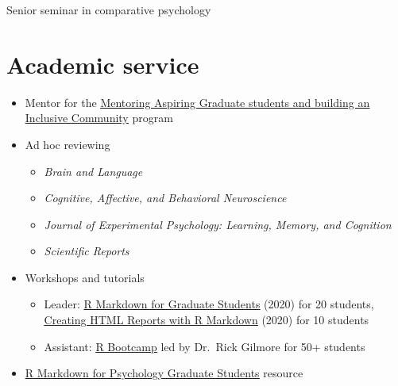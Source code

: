\documentclass[11pt,a4paper,]{awesome-cv}
\providecommand{\tightlist}{%
	\setlength{\itemsep}{0pt}\setlength{\parskip}{0pt}}
\begin{document}
\begin{cventries}
{\begin{cvitems}
\item Senior seminar in comparative psychology
\end{cvitems}}
\end{cventries}

\hypertarget{academic-service}{%
\section{Academic service}\label{academic-service}}

\begin{itemize}
\tightlist
\item
  Mentor for the
  \href{https://magic.initiative.uconn.edu/}{\underline{Mentoring Aspiring Graduate students and building an Inclusive Community}}
  program
\item
  Ad hoc reviewing

  \begin{itemize}
  \tightlist
  \item
    \emph{Brain and Language}
  \item
    \emph{Cognitive, Affective, and Behavioral Neuroscience}
  \item
    \emph{Journal of Experimental Psychology: Learning, Memory, and
    Cognition}
  \item
    \emph{Scientific Reports}
  \end{itemize}
\item
  Workshops and tutorials

  \begin{itemize}
  \tightlist
  \item
    Leader:
    \href{https://github.com/hollzzar/markdown-tutorial}{\underline{R Markdown for Graduate Students}}
    (2020) for 20 students,
    \href{https://github.com/hollzzar/reports-with-markdown}{\underline{Creating HTML Reports with R Markdown}}
    (2020) for 10 students
  \item
    Assistant:
    \href{https://github.com/psu-psychology/r-bootcamp-2019}{\underline{R Bootcamp}}
    led by Dr.~Rick Gilmore for 50+ students
  \end{itemize}
\item
  \href{https://www.hzaharchuk.com/rmarkdown-guide/}{\underline{R Markdown for Psychology Graduate Students}}
  resource
\end{itemize}
\end{document}
